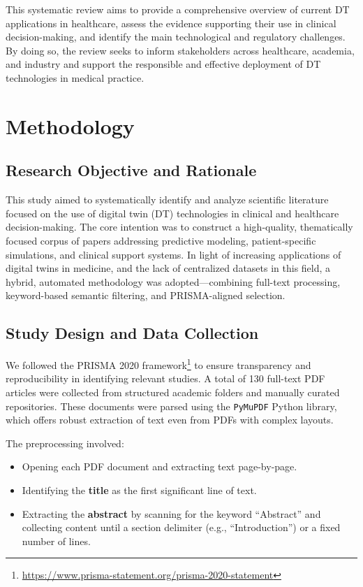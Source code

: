 \documentclass[10pt,a4paper]{article}
\begin{document}
This systematic review aims to provide a comprehensive overview of current DT applications in healthcare, assess the evidence supporting their use in clinical decision-making, and identify the main technological and regulatory challenges. By doing so, the review seeks to inform stakeholders across healthcare, academia, and industry and support the responsible and effective deployment of DT technologies in medical practice.



\section{Methodology}

\subsection*{Research Objective and Rationale}

This study aimed to systematically identify and analyze scientific literature focused on the use of digital twin (DT) technologies in clinical and healthcare decision-making. The core intention was to construct a high-quality, thematically focused corpus of papers addressing predictive modeling, patient-specific simulations, and clinical support systems. In light of increasing applications of digital twins in medicine, and the lack of centralized datasets in this field, a hybrid, automated methodology was adopted—combining full-text processing, keyword-based semantic filtering, and PRISMA-aligned selection.

\subsection*{Study Design and Data Collection}

We followed the PRISMA 2020 framework\footnote{\url{https://www.prisma-statement.org/prisma-2020-statement}} to ensure transparency and reproducibility in identifying relevant studies. A total of 130 full-text PDF articles were collected from structured academic folders and manually curated repositories. These documents were parsed using the \texttt{PyMuPDF} Python library, which offers robust extraction of text even from PDFs with complex layouts.

The preprocessing involved:
\begin{itemize}
    \item Opening each PDF document and extracting text page-by-page.
    \item Identifying the \textbf{title} as the first significant line of text.
    \item Extracting the \textbf{abstract} by scanning for the keyword ``Abstract'' and collecting content until a section delimiter (e.g., ``Introduction'') or a fixed number of lines.
\end{itemize}
\end{document}
